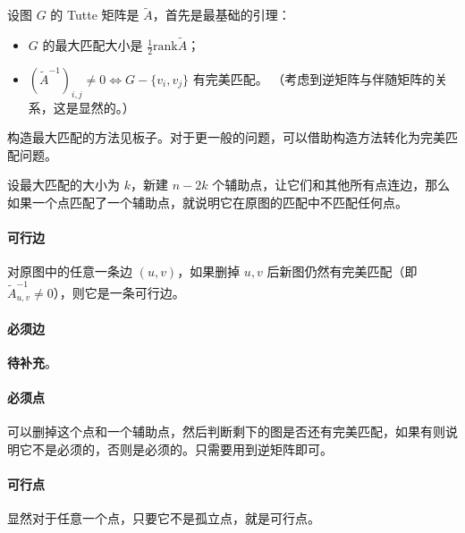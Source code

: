 设图 $G$ 的 Tutte 矩阵是 $\tilde A$，首先是最基础的引理：

\begin{itemize}
	\item $G$ 的最大匹配大小是 $\frac 1 2 \text{rank}{\tilde A}$；
	
	\item $\left({\tilde A} ^{-1}\right) _{i, j} \ne 0 \iff G-\{v_i, v_j\}$ 有完美匹配。
		\subitem （考虑到逆矩阵与伴随矩阵的关系，这是显然的。）
\end{itemize}

构造最大匹配的方法见板子。对于更一般的问题，可以借助构造方法转化为完美匹配问题。

设最大匹配的大小为 $k$，新建 $n - 2k$ 个辅助点，让它们和其他所有点连边，那么如果一个点匹配了一个辅助点，就说明它在原图的匹配中不匹配任何点。

\paragraph{可行边} 对原图中的任意一条边 $(u, v)$，如果删掉 $u, v$ 后新图仍然有完美匹配（即 ${\tilde A} ^ {-1}_{u, v} \ne 0$），则它是一条可行边。

\paragraph{必须边} \textbf{待补充}。

\paragraph{必须点} 可以删掉这个点和一个辅助点，然后判断剩下的图是否还有完美匹配，如果有则说明它不是必须的，否则是必须的。只需要用到逆矩阵即可。

\paragraph{可行点} 显然对于任意一个点，只要它不是孤立点，就是可行点。

